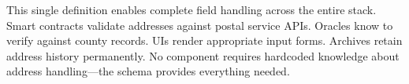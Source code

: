 This single definition enables complete field handling across the entire stack. Smart contracts validate addresses against postal service APIs. Oracles know to verify against county records. UIs render appropriate input forms. Archives retain address history permanently. No component requires hardcoded knowledge about address handling—the schema provides everything needed.


